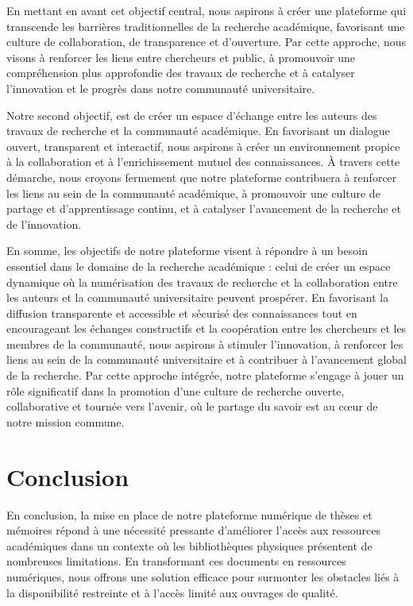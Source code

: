 En mettant en avant cet objectif central, nous aspirons à créer une plateforme qui transcende les barrières traditionnelles de la recherche académique, favorisant une culture de collaboration, de transparence et d'ouverture. Par cette approche, nous visons à renforcer les liens entre chercheurs et public, à promouvoir une compréhension plus approfondie des travaux de recherche et à catalyser l'innovation et le progrès dans notre communauté universitaire.
\par
Notre second objectif, est de créer un espace d'échange entre les auteurs des travaux de recherche et la communauté académique. En favorisant un dialogue ouvert, transparent et interactif, nous aspirons à créer un environnement propice à la collaboration et à l'enrichissement mutuel des connaissances. À travers cette démarche, nous croyons fermement que notre plateforme contribuera à renforcer les liens au sein de la communauté académique, à promouvoir une culture de partage et d'apprentissage continu, et à catalyser l'avancement de la recherche et de l'innovation.\par
En somme, les objectifs de notre plateforme visent à répondre à un besoin essentiel dans le domaine de la recherche académique : celui de créer un espace dynamique où la numérisation des travaux de recherche et la collaboration entre les auteurs et la communauté universitaire peuvent prospérer. En favorisant la diffusion transparente et accessible et sécurisé des connaissances tout en encourageant les échanges constructifs et la coopération entre les chercheurs et les membres de la communauté, nous aspirons à stimuler l'innovation, à renforcer les liens au sein de la communauté universitaire et à contribuer à l'avancement global de la recherche. Par cette approche intégrée, notre plateforme s'engage à jouer un rôle significatif dans la promotion d'une culture de recherche ouverte, collaborative et tournée vers l'avenir, où le partage du savoir est au cœur de notre mission commune.
\section*{Conclusion}

En conclusion, la mise en place de notre plateforme numérique de thèses et mémoires répond à une nécessité pressante d'améliorer l'accès aux ressources académiques dans un contexte où les bibliothèques physiques présentent de nombreuses limitations. En transformant ces documents en ressources numériques, nous offrons une solution efficace pour surmonter les obstacles liés à la disponibilité restreinte et à l'accès limité aux ouvrages de qualité.\par

